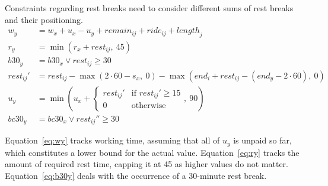 \documentclass[]{amsart}
\theoremstyle{plain}
\begin{document}
Constraints regarding rest breaks need to consider different sums of rest breaks and their positioning.
{\small
\begin{align}
    \label{eq:wy}
    w_y &= w_x+u_x-u_y+\mathit{remain}_{ij}+\mathit{ride}_{ij}+\mathit{length}_j\\
    \label{eq:ry}
    r_y &= \min(r_x+\mathit{rest}_{ij},~45)\\
    \label{eq:b30y}
    \mathit{b30}_y &= \mathit{b30}_x\lor\mathit{rest}_{ij}\geq30\\
    \label{eq:restp}
    \mathit{rest}_{ij}' &= \mathit{rest}_{ij}-\max(2\cdot60-s_x,~0)-\max(\mathit{end}_i+\mathit{rest}_{ij}-(\mathit{end}_y-2\cdot60),~0)\\
    \label{eq:uy}
    u_y &= \min\left(u_x+\begin{cases}\mathit{rest}_{ij}' & \text{if }\mathit{rest}_{ij}'\geq15\\
    0 & \text{otherwise}
    \end{cases},~90\right)\\
    \label{eq:bc30y}
    \mathit{bc30}_y &= \mathit{bc30}_x\lor\mathit{rest}_{ij}''\geq30
\end{align}
}%

\noindent
Equation~\eqref{eq:wy} tracks working time, assuming that all of $u_y$ is unpaid so far, which constitutes a lower bound for the actual value. Equation~\eqref{eq:ry} tracks the amount of required rest time, capping it at 45 as higher values do not matter. Equation~\eqref{eq:b30y} deals with the occurrence of a 30-minute rest break.
\end{document}

